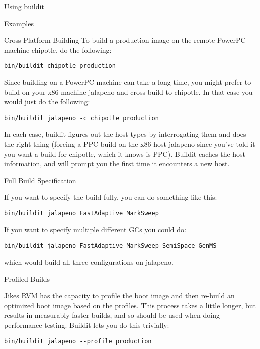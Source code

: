 \begin{section}{Using buildit}
\begin{subsection}{Examples}
\begin{subsubsection}{Cross Platform Building}
To build a production image on the remote PowerPC machine chipotle, do the following: 

\begin{lstlisting}
bin/buildit chipotle production
\end{lstlisting}

Since building on a PowerPC machine can take a long time, you might prefer to build on your x86 machine jalapeno and cross-build to chipotle.  In that case you would just do the following: 

\begin{lstlisting}
bin/buildit jalapeno -c chipotle production
\end{lstlisting}

In each case, buildit figures out the host types by interrogating them and does the right thing (forcing a PPC build on the x86 host jalapeno since you've told it you want a build for chipotle, which it knows is PPC).  Buildit caches the host information, and will prompt you the first time it encounters a new host. 

\end{subsubsection}

\begin{subsubsection}{Full Build Specification}

If you want to specify the build fully, you can do something like this:

\begin{lstlisting}
bin/buildit jalapeno FastAdaptive MarkSweep
\end{lstlisting}

If you want to specify multiple different GCs you could do:

\begin{lstlisting}
bin/buildit jalapeno FastAdaptive MarkSweep SemiSpace GenMS
\end{lstlisting}

which would build all three configurations on jalapeno.
\end{subsubsection}

\begin{subsubsection}{Profiled Builds}

Jikes RVM has the capacity to profile the boot image and then re-build an optimized boot image based on the profiles.  This process takes a little longer, but results in measurably faster builds, and so should be used when doing performance testing.  Buildit lets you do this trivially:

\begin{lstlisting}
bin/buildit jalapeno --profile production
\end{lstlisting}


\end{subsubsection}
\end{subsection}
\end{section}
